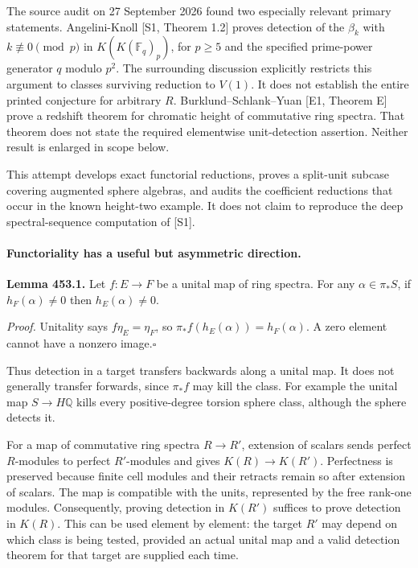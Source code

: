 \documentclass[11pt]{article}
\begin{document}
The source audit on 27 September 2026 found two especially relevant
primary statements. Angelini-Knoll [S1, Theorem 1.2] proves detection
of the $\beta_k$ with $k\not\equiv0\pmod p$ in
$K(K(\mathbb F_q)_p)$, for $p\geq5$ and the specified prime-power
generator $q$ modulo $p^2$. The surrounding discussion explicitly
restricts this argument to classes surviving reduction to $V(1)$.
It does not establish the entire printed conjecture for arbitrary $R$.
Burklund--Schlank--Yuan [E1, Theorem E] prove a redshift theorem for
chromatic height of commutative ring spectra. That theorem does not
state the required elementwise unit-detection assertion. Neither
result is enlarged in scope below.

This attempt develops exact functorial reductions, proves a split-unit
subcase covering augmented sphere algebras, and audits the coefficient
reductions that occur in the known height-two example. It does not
claim to reproduce the deep spectral-sequence computation of [S1].

\paragraph{Functoriality has a useful but asymmetric direction.}
\textbf{Lemma 453.1.} Let $f:E\to F$ be a unital map of ring spectra.
For any $\alpha\in\pi_*S$, if $h_F(\alpha)\ne0$ then
$h_E(\alpha)\ne0$.

\emph{Proof.}
Unitality says $f\eta_E=\eta_F$, so
$\pi_*f(h_E(\alpha))=h_F(\alpha)$. A zero element cannot have a
nonzero image.\hfill$\square$

Thus detection in a target transfers backwards along a unital map.
It does not generally transfer forwards, since $\pi_*f$ may kill the
class. For example the unital map $S\to H\mathbb Q$ kills every
positive-degree torsion sphere class, although the sphere detects it.

For a map of commutative ring spectra $R\to R'$, extension of scalars
sends perfect $R$-modules to perfect $R'$-modules and gives
$K(R)\to K(R')$. Perfectness is preserved because finite cell modules
and their retracts remain so after extension of scalars. The map is
compatible with the units, represented by the free rank-one modules.
Consequently, proving detection in $K(R')$ suffices to prove detection
in $K(R)$. This can be used element by element: the target $R'$ may
depend on which class is being tested, provided an actual unital map
and a valid detection theorem for that target are supplied each time.
\end{document}
